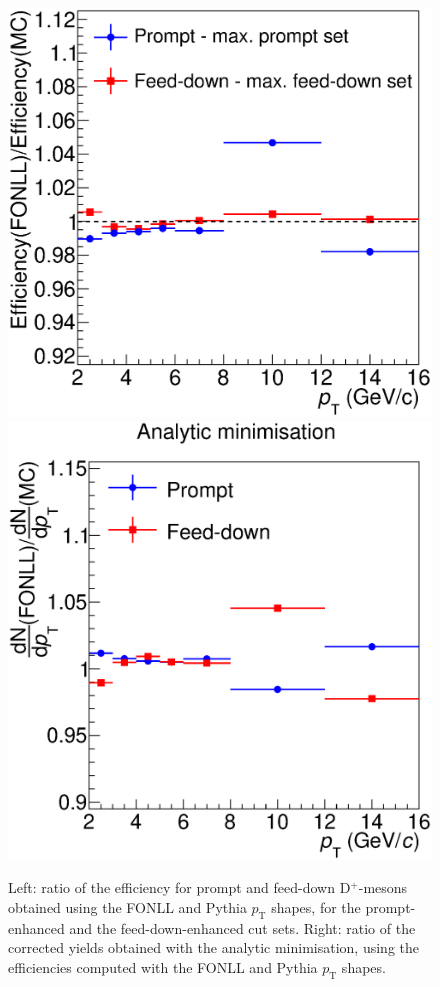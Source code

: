 \documentclass[b5paper,10pt,twoside,oldstyle,classica]{toptesi}
\newcommand{\pt}{p_\text{T}}
\begin{document}
\begin{figure}[tb]
\begin{center}
{\includegraphics[scale = 0.3]{EffRatioCombined_Set_1-3.eps}}
\hspace{0cm}
{\includegraphics[scale = 0.3]{CorrYieldsMin_syst_eff_onlyratio.eps}}
\caption{Left: ratio of the efficiency for prompt and feed-down D$^+$-mesons obtained using the FONLL and Pythia $\pt$ shapes, for the prompt-enhanced and the feed-down-enhanced cut sets. Right: ratio of the corrected yields obtained with the analytic minimisation, using the efficiencies computed with the FONLL and Pythia $\pt$ shapes.}
\label{cutvar_syst_eff}
\end{center}
\end{figure} 
\end{document}
